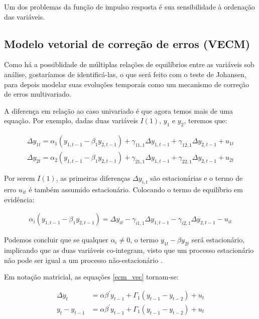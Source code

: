 \documentclass[a4paper,
               article,
               12pt,
               openany,
               oneside,
               english,
               brazil]{abntex2}
\numberwithin{equation}{section}
\begin{document}
   Um dos problemas da função de impulso resposta é sua sensibilidade à ordenação das variáveis.

    \subsection{Modelo vetorial de correção de erros (VECM)}

    Como há a possiblidade de múltiplas relações de equilíbrios entre as variáveis sob análise, gostaríamos de identificá-las, o que será feito com o teste de Johansen, para depois modelar suas evoluções temporais como um mecanismo de correção de erros multivariado.

    A diferença em relação ao caso univariado é que agora temos mais de uma equação. Por exemplo, dadas duas variáveis $ I(1) $, $ y_1 $ e $ y_2 $, teremos que:

    \begin{equation}
        \begin{aligned}
            \label{ecm_vec}
            \Delta y_{1t} = \alpha_1 (y_{1,t-1} - \beta_1 y_{2, t-1}) + \gamma_{11,1} \Delta y_{1,t-1} + \gamma_{12,1} \Delta y_{2,t-1} + u_{1t} \\
            \Delta y_{2t} = \alpha_2 (y_{1,t-1} - \beta_1 y_{2, t-1}) + \gamma_{21,1} \Delta y_{1,t-1} + \gamma_{22,1} \Delta y_{2,t-1} + u_{2t}
        \end{aligned}
    \end{equation}

    Por serem $ I(1) $, as primeiras diferenças $ \Delta y_{i,t} $ são estacionárias e o termo de erro $ u_{it} $ é também assumido estacionário. Colocando o termo de equilíbrio em evidência:

    \begin{align*}
        \alpha_i (y_{1,t-1} - \beta_1 y_{2, t-1}) = \Delta y_{it} - \gamma_{i1,1} \Delta y_{1,t-1} - \gamma_{i2,1} \Delta y_{2,t-1} - u_{it}
    \end{align*}

    Podemos concluir que se qualquer $ \alpha_{i} \neq 0 $, o termo $ y_{1t} - \beta y_{2t} $ será estacionário, implicando que as duas variáveis co-integram, visto que um processo estacionário não pode ser igual a um processo não-estacionário \cite[p.~244-247]{lutkepool}.

    Em notação matricial, as equações \eqref{ecm_vec} tornam-se:

    \begin{equation}
        \label{vecm}
        \begin{aligned}
            \Delta y_t &= \alpha \beta^{'} y_{t-1} + \Gamma_1(y_{t-1} - y_{t-2}) + u_t \\
            y_t - y_{t-1} &= \alpha \beta^{'} y_{t-1} + \Gamma_1(y_{t-1} - y_{t-2}) + u_t \\
        \end{aligned}
    \end{equation}
\end{document}
